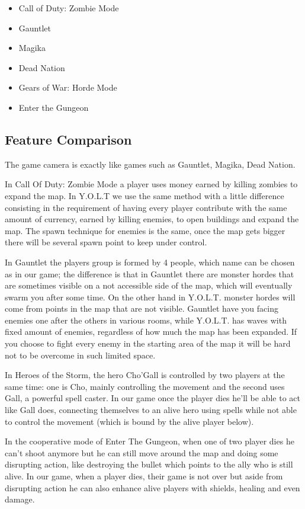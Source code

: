 \documentclass[12pt]{article}
\begin{document}
\begin{itemize}
	\item Call of Duty: Zombie Mode
	\item Gauntlet
	\item Magika
	\item Dead Nation
	\item Gears of War: Horde Mode
	\item Enter the Gungeon
\end{itemize}

\subsection{Feature Comparison}

The game camera is exactly like games such as Gauntlet, Magika, Dead Nation.

In Call Of Duty: Zombie Mode a player uses money earned by killing zombies to expand the map. In Y.O.L.T we use the same method with a little difference consisting in the requirement of having every player contribute with the same amount of currency, earned by killing enemies, to open buildings and expand the map. The spawn technique for enemies is the same, once the map gets bigger there will be several spawn point to keep under control.

In Gauntlet the players group is formed by 4 people, which name can be chosen as in our game; the difference is that in Gauntlet there are monster hordes that are sometimes visible on a not accessible side of the map, which will eventually swarm you after some time. On the other hand in Y.O.L.T. monster hordes will come from points in the map that are not visible. Gauntlet have you facing enemies one after the others in various rooms, while Y.O.L.T. has waves with fixed amount of enemies, regardless of how much the map has been expanded. If you choose to fight every enemy in the starting area of the map it will be hard not to be overcome in such limited space. 

In Heroes of the Storm, the hero Cho’Gall is controlled by two players at the same time: one is Cho, mainly controlling the movement and the second uses Gall, a powerful spell caster. In our game once the player dies he’ll be able to act like Gall does, connecting themselves to an alive hero using spells while not able to control the movement (which is bound by the alive player below).

In the cooperative mode of Enter The Gungeon, when one of two player dies he can’t shoot anymore but he can still move around the map and doing some disrupting action, like destroying the bullet which points to the ally who is still alive. In our game, when a player dies, their game is not over but aside from disrupting action he can also enhance alive players with shields, healing and even damage.
\end{document}
